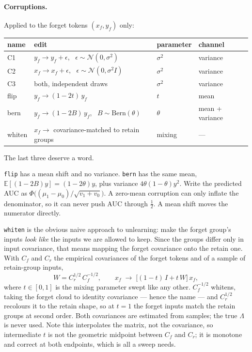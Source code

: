 \documentclass[11pt,a4paper]{article}
\newcommand{\vs}{\sigma^2}
\begin{document}
\paragraph{Corruptions.} Applied to the forget tokens $(x_f,y_f)$ only:
\begin{center}\small
\begin{tabular}{llll}
\toprule
name & edit & parameter & channel\\
\midrule
C1 & $y_f \to y_f + \epsilon$, \ $\epsilon\sim\mathcal N(0,\vs)$ & $\vs$ & variance\\
C2 & $x_f \to x_f + \epsilon$, \ $\epsilon\sim\mathcal N(0,\vs I)$ & $\vs$ & variance\\
C3 & both, independent draws & $\vs$ & variance\\
flip & $y_f \to (1-2t)\,y_f$ & $t$ & mean\\
bern & $y_f \to (1-2B)\,y_f$, \ $B\sim\mathrm{Bern}(\theta)$ & $\theta$ & mean + variance\\
whiten & $x_f \to$ covariance-matched to retain groups & mixing & --- \\
\bottomrule
\end{tabular}
\end{center}

The last three deserve a word.

\texttt{flip} has a mean shift and no variance. \texttt{bern} has the same
mean, $\mathbb E[(1-2B)y]=(1-2\theta)y$, plus variance $4\theta(1-\theta)y^2$.
Write the predicted AUC as $\Phi\!\big((\mu_1-\mu_0)/\sqrt{v_1+v_0}\big)$. A
zero-mean corruption can only inflate the denominator, so it can never push AUC
through $\tfrac12$. A mean shift moves the numerator directly.

\texttt{whiten} is the obvious naive approach to unlearning: make the forget
group's inputs \emph{look like} the inputs we are allowed to keep. Since the
groups differ only in input covariance, that means mapping the forget
covariance onto the retain one. With $C_f$ and $C_r$ the empirical covariances
of the forget tokens and of a sample of retain-group inputs,
\begin{equation}
W = C_r^{1/2}\,C_f^{-1/2},
\qquad
x_f \;\to\; \big[(1-t)\,I + t\,W\big]\,x_f ,
\end{equation}
where $t\in[0,1]$ is the mixing parameter swept like any other. $C_f^{-1/2}$
whitens, taking the forget cloud to identity covariance --- hence the name ---
and $C_r^{1/2}$ recolours it to the retain shape, so at $t=1$ the forget inputs
match the retain groups at second order. Both covariances are estimated from
samples; the true $\Lambda$ is never used. Note this interpolates the matrix,
not the covariance, so intermediate $t$ is not the geometric midpoint between
$C_f$ and $C_r$; it is monotone and correct at both endpoints, which is all a
sweep needs.
\end{document}
